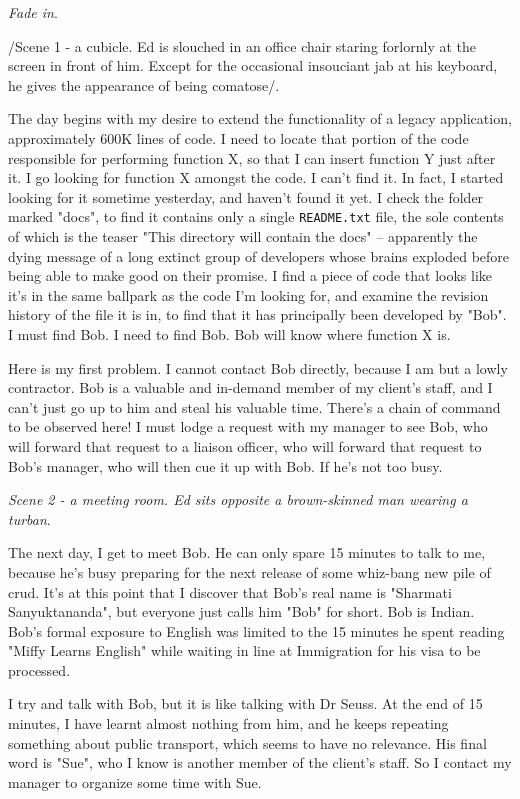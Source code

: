 \documentclass{article}
\begin{document}
\emph{Fade in}.

/Scene 1 - a cubicle. Ed is slouched in an office chair staring
forlornly at the screen in front of him. Except for the occasional
insouciant jab at his keyboard, he gives the appearance of being
comatose/.

The day begins with my desire to extend the functionality of a legacy
application, approximately 600K lines of code. I need to locate that
portion of the code responsible for performing function X, so that I can
insert function Y just after it. I go looking for function X amongst the
code. I can't find it. In fact, I started looking for it sometime
yesterday, and haven't found it yet. I check the folder marked "docs",
to find it contains only a single \texttt{README.txt} file, the sole contents
of which is the teaser "This directory will contain the docs" --
apparently the dying message of a long extinct group of developers whose
brains exploded before being able to make good on their promise. I find
a piece of code that looks like it's in the same ballpark as the code
I'm looking for, and examine the revision history of the file it is in,
to find that it has principally been developed by "Bob". I must find
Bob. I need to find Bob. Bob will know where function X is.

Here is my first problem. I cannot contact Bob directly, because I am
but a lowly contractor. Bob is a valuable and in-demand member of my
client's staff, and I can't just go up to him and steal his valuable
time. There's a chain of command to be observed here! I must lodge a
request with my manager to see Bob, who will forward that request to a
liaison officer, who will forward that request to Bob's manager, who
will then cue it up with Bob. If he's not too busy.

\emph{Scene 2 - a meeting room. Ed sits opposite a brown-skinned man wearing
a turban}.

The next day, I get to meet Bob. He can only spare 15 minutes to talk to
me, because he's busy preparing for the next release of some whiz-bang
new pile of crud. It's at this point that I discover that Bob's real
name is "Sharmati Sanyuktananda", but everyone just calls him "Bob" for
short. Bob is Indian. Bob's formal exposure to English was limited to
the 15 minutes he spent reading "Miffy Learns English" while waiting in
line at Immigration for his visa to be processed.

I try and talk with Bob, but it is like talking with Dr Seuss. At the
end of 15 minutes, I have learnt almost nothing from him, and he keeps
repeating something about public transport, which seems to have no
relevance. His final word is "Sue", who I know is another member of the
client's staff. So I contact my manager to organize some time with Sue.
\end{document}
